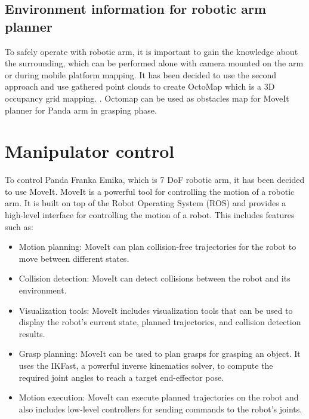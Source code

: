 \documentclass[conference,a4paper]{IEEEtran}
\begin{document}
\subsection{Environment information for robotic arm planner}
To safely operate with robotic arm, it is important to gain the knowledge about the surrounding, which can be performed alone with camera mounted on the arm or during mobile platform mapping.
It has been decided to use the second approach and use gathered point clouds to create OctoMap which is a 3D occupancy grid mapping. \cite{octomap}. Octomap can be used as obstacles map for MoveIt planner for Panda arm in grasping phase.


\section{Manipulator control}
 To control Panda Franka Emika, which is 7 DoF robotic arm, it has been decided to use MoveIt. MoveIt is a powerful tool for controlling the motion of a robotic arm. It is built on top of the Robot Operating System (ROS) and provides a high-level interface for controlling the motion of a robot. This includes features such as:
 \begin{itemize}
  \item Motion planning: MoveIt can plan collision-free trajectories for the robot to move between different states. 
  \item Collision detection: MoveIt can detect collisions between the robot and its environment.
  \item Visualization tools: MoveIt includes visualization tools that can be used to display the robot's current state, planned trajectories, and collision detection results.
  \item Grasp planning: MoveIt can be used to plan grasps for grasping an object. It uses the IKFast, a powerful inverse kinematics solver, to compute the required joint angles to reach a target end-effector pose.
  \item Motion execution: MoveIt can execute planned trajectories on the robot and also includes low-level controllers for sending commands to the robot's joints.
 \end{itemize}
\end{document}
